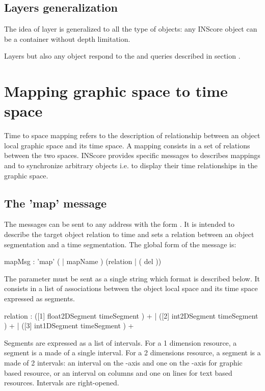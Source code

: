 \documentclass[a4paper,twoside]{report}
\newcommand{\toplevel}[1]	{\chapter{#1}}
\newcommand{\sublevel}[1]	{\section{#1}}
\begin{document}
\sublevel{Layers generalization}
\label{layersgen}

The idea of layer is generalized to all the type of objects: any INScore object can be a container without depth limitation. 

Layers but also any object respond to the  and  queries described in section .

\toplevel{Mapping graphic space to time space}
\label{mapping}

Time to space mapping refers to the description of relationship between an object local graphic space and its time space. A mapping consists in a set of relations between the two spaces. INScore provides specific messages to describes mappings and to synchronize arbitrary objects i.e. to display their time relationships in the graphic space.

\sublevel{The 'map' message}
\label{mapMsg}

The  messages can be sent to any address with the form . It is intended to describe the target object relation to time and sets a relation between an object segmentation and a time segmentation. 
The global form of the message is:


\begin{rail}
mapMsg : 'map' ( | mapName ) (relation	|	( del ))
\end{rail}

The  parameter must be sent as a single string which format is described below. It consists in a list of associations between the object local space and its time space expressed as segments.

\begin{rail}
relation : 
		([1] float2DSegment timeSegment ) +
	| 	([2] int2DSegment timeSegment ) +
	| 	([3] int1DSegment timeSegment ) + 
\end{rail}

Segments are expressed as a list of intervals. For a 1 dimension resource, a segment is a made of a single interval. For a 2 dimensions resource, a segment is a made of 2 intervals: an interval on the -axis and one on the -axis for graphic based resource, or an interval on columns and one on lines for text based resources. Intervals are right-opened.
\end{document}
